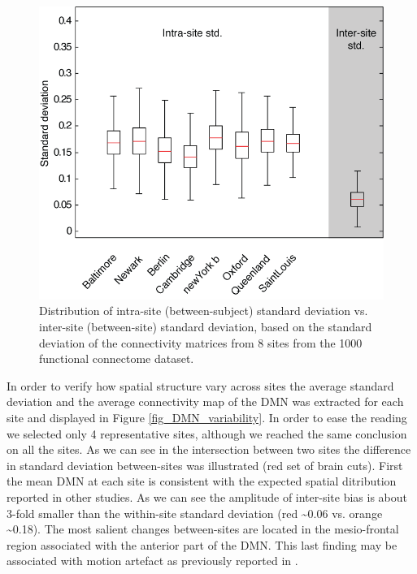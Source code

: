 \documentclass[authoryear]{elsarticle}
\begin{document}
\begin{figure}[H]
\begin{center}
\includegraphics[width=\linewidth]{../figures/inter_vs_intra_3tonly.png}
\end{center}
\caption[inter vs. intra site variability]{
  Distribution of intra-site (between-subject) standard deviation vs. inter-site (between-site) standard deviation, based on the standard deviation of the connectivity matrices from 8 sites from the 1000 functional connectome dataset.
}
\label{fig_site_variability}
\end{figure}

In order to verify how spatial structure vary across sites the average standard deviation and the average connectivity map of the DMN was extracted for each site and displayed in Figure \ref{fig_DMN_variability}. In order to ease the reading we selected only 4 representative sites, although we reached the same conclusion on all the sites. As we can see in the intersection between two sites the difference in standard deviation between-sites was illustrated (red set of brain cuts). First the mean DMN at each site is consistent with the expected spatial ditribution reported in other studies. As we can see the amplitude of inter-site bias is about 3-fold smaller than the within-site standard deviation (red \textasciitilde0.06 vs. orange \textasciitilde0.18). The most salient changes between-sites are located in the mesio-frontal region associated with the anterior part of the DMN. This last finding may be associated with motion artefact as previously reported in \cite{Dansereau2014}.
\end{document}
